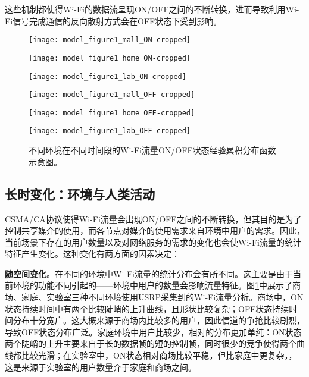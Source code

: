 这些机制都使得Wi-Fi的数据流呈现ON/OFF之间的不断转换，进而导致利用Wi-Fi信号完成通信的反向散射方式会在OFF状态下受到影响。
\begin{figure}
	\begin{minipage}[b]{.32\linewidth}
		\texttt{[image: model\_figure1\_mall\_ON-cropped]}
		\label{fig:ecdf_mall_on}
	\end{minipage}
	\hfill
	\begin{minipage}[b]{.32\linewidth}
		\texttt{[image: model\_figure1\_home\_ON-cropped]}
		\label{fig:ecdf_home_on}
	\end{minipage}
	\hfill
	\begin{minipage}[b]{.32\linewidth}
		\texttt{[image: model\_figure1\_lab\_ON-cropped]}
		\label{fig:ecdf_lab_on}
	\end{minipage}
	
	\begin{minipage}[b]{.32\linewidth}
		\texttt{[image: model\_figure1\_mall\_OFF-cropped]}
		\label{fig:ecdf_mall_off}
	\end{minipage}
	\hfill
	\begin{minipage}[b]{.32\linewidth}
		\texttt{[image: model\_figure1\_home\_OFF-cropped]}
		\label{fig:ecdf_home_off}
	\end{minipage}
	\hfill
	\begin{minipage}[b]{.32\linewidth}
		\texttt{[image: model\_figure1\_lab\_OFF-cropped]}
		\label{fig:ecdf_lab_off}
	\end{minipage}
	\caption{不同环境在不同时间段的Wi-Fi流量ON/OFF状态经验累积分布函数示意图。}\label{fig:ecdf}
\end{figure}
\subsection{长时变化：环境与人类活动}
CSMA/CA协议使得Wi-Fi流量会出现ON/OFF之间的不断转换，但其目的是为了控制共享媒介的使用，而各节点对媒介的使用需求来自环境中用户的需求。因此，当前场景下存在的用户数量以及对网络服务的需求的变化也会使Wi-Fi流量的统计特征产生变化。这种变化有两方面的因素决定：

\textbf{随空间变化}。在不同的环境中Wi-Fi流量的统计分布会有所不同。这主要是由于当前环境的功能不同引起的——环境中用户的数量会影响流量特征。图\ref{fig:ecdf}中展示了商场、家庭、实验室三种不同环境使用USRP采集到的Wi-Fi流量分析。商场中，ON状态持续时间中有两个比较陡峭的上升曲线，且形状比较复杂；OFF状态持续时间分布十分宽广。这大概来源于商场内比较多的用户，因此信道的争抢比较剧烈，导致OFF状态分布广泛。家庭环境中用户比较少，相对的分布更加单纯：ON状态两个陡峭的上升主要来自于长的数据帧的短的控制帧，同时很少的竞争使得两个曲线都比较光滑；在实验室中，ON状态相对商场比较平稳，但比家庭中更复杂，，这是来源于实验室的用户数量介于家庭和商场之间。

